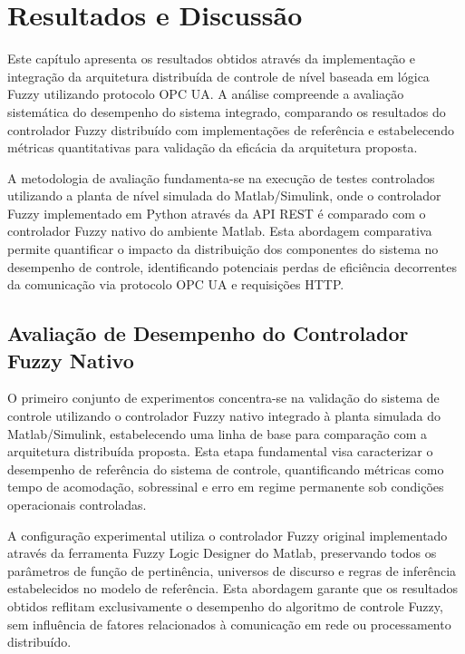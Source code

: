 \chapter{Resultados e Discussão}
\label{cap:resultadosediscussao}

Este capítulo apresenta os resultados obtidos através da implementação e integração da arquitetura distribuída de controle de nível baseada em lógica Fuzzy utilizando protocolo OPC UA. A análise compreende a avaliação sistemática do desempenho do sistema integrado, comparando os resultados do controlador Fuzzy distribuído com implementações de referência e estabelecendo métricas quantitativas para validação da eficácia da arquitetura proposta.

A metodologia de avaliação fundamenta-se na execução de testes controlados utilizando a planta de nível simulada do Matlab/Simulink, onde o controlador Fuzzy implementado em Python através da API REST é comparado com o controlador Fuzzy nativo do ambiente Matlab. Esta abordagem comparativa permite quantificar o impacto da distribuição dos componentes do sistema no desempenho de controle, identificando potenciais perdas de eficiência decorrentes da comunicação via protocolo OPC UA e requisições HTTP.

\section{Avaliação de Desempenho do Controlador Fuzzy Nativo}
\label{sec:fuzzynativo}

O primeiro conjunto de experimentos concentra-se na validação do sistema de controle utilizando o controlador Fuzzy nativo integrado à planta simulada do Matlab/Simulink, estabelecendo uma linha de base para comparação com a arquitetura distribuída proposta. Esta etapa fundamental visa caracterizar o desempenho de referência do sistema de controle, quantificando métricas como tempo de acomodação, sobressinal e erro em regime permanente sob condições operacionais controladas.

A configuração experimental utiliza o controlador Fuzzy original implementado através da ferramenta Fuzzy Logic Designer do Matlab, preservando todos os parâmetros de função de pertinência, universos de discurso e regras de inferência estabelecidos no modelo de referência. Esta abordagem garante que os resultados obtidos reflitam exclusivamente o desempenho do algoritmo de controle Fuzzy, sem influência de fatores relacionados à comunicação em rede ou processamento distribuído.


